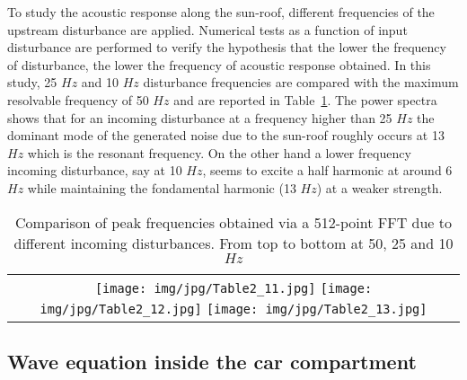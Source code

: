 \documentclass[10pt]{article}
\theoremstyle{plain}
\theoremstyle{definition}
\theoremstyle{remark}
\begin{document}
To study the acoustic response along the sun-roof, different frequencies of the upstream disturbance are applied.
Numerical tests as a function of input disturbance are performed to verify the hypothesis that the lower the frequency of disturbance, the lower the frequency of acoustic response obtained.
In this study, 25 $Hz$ and 10 $Hz$ disturbance frequencies are compared with the maximum resolvable frequency of 50 $Hz$ and are reported in Table~\ref{Table2}.
The power spectra shows that for an incoming disturbance at a frequency higher than 25 $Hz$ the dominant mode of the generated noise due to the sun-roof roughly occurs at 13 $Hz$ which is the resonant frequency.
On the other hand a lower frequency incoming disturbance, say at 10 $Hz$, seems to excite a half harmonic at around 6 $Hz$ while maintaining the fondamental harmonic (13 $Hz$) at a weaker strength.
%
\begin{table}[htbp]
\begin{center}
\caption{Comparison of peak frequencies obtained via a 512-point FFT due to different incoming disturbances. From top to bottom at 50, 25 and 10 $Hz$}\label{Table2}
\begin{tabular}{c}
\texttt{[image: img/jpg/Table2\_11.jpg]} %
\texttt{[image: img/jpg/Table2\_12.jpg]} %
\texttt{[image: img/jpg/Table2\_13.jpg]}
\end{tabular}
\end{center}
\end{table}
%


\subsection{Wave equation inside the car compartment}
\end{document}
